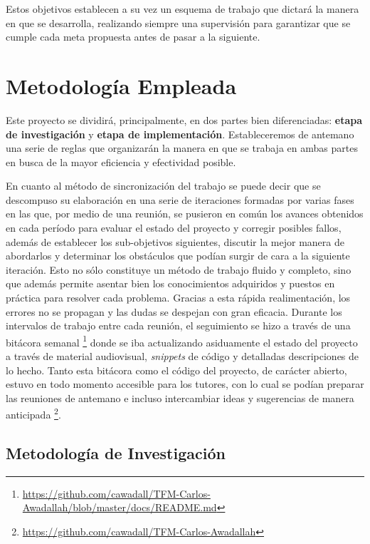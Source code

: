 Estos objetivos establecen a su vez un esquema de trabajo que dictará la manera en que se desarrolla, realizando siempre una supervisión para garantizar que se cumple cada meta propuesta antes de pasar a la siguiente.

\section{Metodología Empleada}

Este proyecto se dividirá, principalmente, en dos partes bien diferenciadas: \textbf{etapa de investigación} y \textbf{etapa de implementación}. Estableceremos de antemano una serie de reglas que organizarán la manera en que se trabaja en ambas partes en busca de la mayor eficiencia y efectividad posible.

En cuanto al método de sincronización del trabajo se puede decir que se descompuso su elaboración en una serie de iteraciones formadas por varias fases en las que, por medio de una reunión, se pusieron en común los avances obtenidos en cada período para evaluar el estado del proyecto y corregir posibles fallos, además de establecer los sub-objetivos siguientes, discutir la mejor manera de abordarlos y determinar los obstáculos que podían surgir de cara a la siguiente iteración. Esto no sólo constituye un método de trabajo fluido y completo, sino que además permite asentar bien los conocimientos adquiridos y puestos en práctica para resolver cada problema. Gracias a esta rápida realimentación, los errores no se propagan y las dudas se despejan con gran eficacia. Durante los intervalos de trabajo entre cada reunión, el seguimiento se hizo a través de una bitácora semanal \footnote{\url{https://github.com/cawadall/TFM-Carlos-Awadallah/blob/master/docs/README.md}} donde se iba actualizando asiduamente el estado del proyecto a través de material audiovisual, \textit{snippets} de código y detalladas descripciones de lo hecho. Tanto esta bitácora como el código del proyecto, de carácter abierto, estuvo en todo momento accesible para los tutores, con lo cual se podían preparar las reuniones de antemano e incluso intercambiar ideas y sugerencias de manera anticipada \footnote{\url{https://github.com/cawadall/TFM-Carlos-Awadallah}}.

\subsection{Metodología de Investigación}

